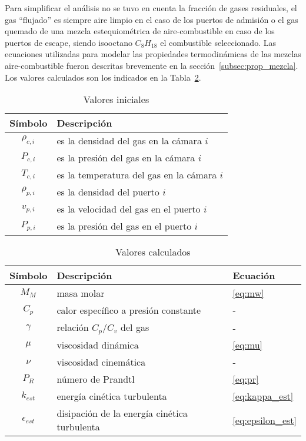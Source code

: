 Para simplificar el análisis no se tuvo en cuenta la fracción de gases
residuales, el gas ``flujado'' es siempre aire limpio en el caso de los puertos
de admisión o el gas quemado de una mezcla estequiométrica de aire-combustible
en caso de los puertos de escape, siendo isooctano $C_{8}H_{18}$ el combustible
seleccionado.
%
Las ecuaciones utilizadas para modelar las propiedades termodinámicas de las
mezclas aire-combustible fueron descritas brevemente en la
sección~\ref{subsec:prop_mezcla}.
%
Los valores calculados son los indicados en la
Tabla~\ref{tab:valores_calculados}.

\begin{table}[h!]
  \centering
  \begin{tabular}{cl}\toprule
    Símbolo & Descripción \\ \midrule
    $\rho_{c,i}$ & es la densidad del gas en la cámara $i$ \\
    $P_{c,i}$ & es la presión del gas en la cámara $i$ \\
    $T_{c,i}$ & es la temperatura del gas en la cámara $i$ \\
    $\rho_{p,i}$ & es la densidad del puerto $i$ \\
    $v_{p,i}$ & es la velocidad del gas en el puerto $i$ \\
    $P_{p,i}$ & es la presión del gas en el puerto $i$ \\ \bottomrule
  \end{tabular}
\caption{Valores iniciales}\label{tab:valores_iniciales}
\end{table}

\begin{table}[h!]
  \centering
  \begin{tabular}{cll}\toprule
    Símbolo & Descripción & Ecuación\\ \midrule
    $M_{M}$ & masa molar & \ref{eq:mw} \\
    $C_{p}$ & calor específico a presión constante & - \\
    $\gamma$ & relación $C_{p}/C_{v}$ del gas & - \\
    $\mu$ & viscosidad dinámica & \ref{eq:mu} \\
    $\nu$ & viscosidad cinemática & - \\
    $P_{R}$ & número de Prandtl & \ref{eq:pr} \\
    $k_{est}$ & energía cinética turbulenta & \ref{eq:kappa_est} \\
    $\epsilon_{est}$ & disipación de la energía cinética turbulenta & \ref{eq:epsilon_est} \\ \bottomrule
  \end{tabular}
  \caption{Valores calculados}\label{tab:valores_calculados}
\end{table}

